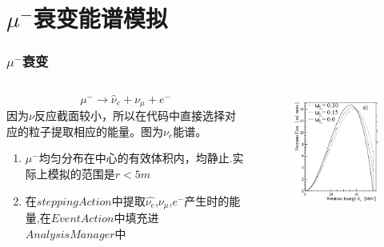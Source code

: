 \documentclass{beamer}
\begin{document}
\section{$\mu^-$衰变能谱模拟}
\begin{frame}
    \frametitle{$\mu^-$衰变}
    \begin{columns}
        \begin{column}{0.5\textwidth}
            \[\mu^-\to \hat{\nu}_e+\nu_{\mu}+e^-\]
            因为$\nu$反应截面较小，所以在代码中直接选择对应的粒子提取相应的能量。图为$\nu_e$能谱\cite{Armbruster:1998qi}。
            \begin{enumerate}
                \item $\mu^-$均匀分布在中心的有效体积内，均静止.实际上模拟的范围是$r<5m$
                \item 在$steppingAction$中提取$\hat{\nu_e}$,$\nu_{\mu}$,$e^-$产生时的能量,在$EventAction$中填充进$AnalysisManager$中
            \end{enumerate}
        \end{column}
        \begin{column}{0.5\textwidth}
            \begin{figure}
                \includegraphics[width=\columnwidth]{figure/nu_eSpectra.png}
            \end{figure}
        \end{column}
    \end{columns}
\end{frame}
\end{document}
